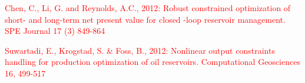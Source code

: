 \documentclass[twocolumn,numbook]{svjour3}          %
\newcommand{\red}[1]{\textcolor{red}{#1}}
\begin{document}
\red{Chen, C., Li, G. and Reynolds, A.C., 2012: Robust constrained optimization of short- and long-term net present value for closed
-loop reservoir management. SPE Journal 17 (3) 849-864}

\red{Suwartadi, E., Krogstad, S. & Foss, B., 2012: Nonlinear output constraints handling for production optimization of oil reservoirs. Computational Geosciences 16, 499-517}


\end{document}
